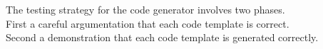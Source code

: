 \begin{slide*}
The testing strategy for the code generator involves 
two phases.\\

First a careful
argumentation that each code template is correct.\\

Second a demonstration that each code template is generated correctly.\\

\vfil
\end{slide*}
 
\begin{slide*}
\vfil
\end{slide*}
 
\begin{slide*}
\vfil
\end{slide*}
 
\begin{slide*}
\vfil
\end{slide*}
 
\begin{slide*}
\vfil
\end{slide*}
 
\begin{slide*}
\vfil
\end{slide*}
 
\begin{slide*}
\vfil
\end{slide*}
 
\begin{slide*}
\vfil
\end{slide*}
 



